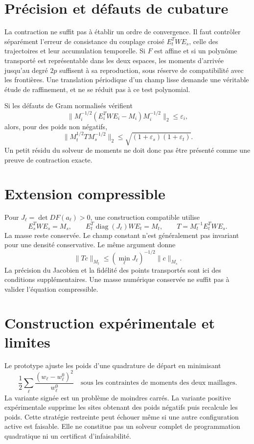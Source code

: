 \documentclass[11pt,a4paper]{article}
\begin{document}
\section{Précision et défauts de cubature}
La contraction ne suffit pas à établir un ordre de convergence. Il faut
contrôler séparément l'erreur de consistance du couplage croisé
$E_t^TWE_s$, celle des trajectoires et leur accumulation temporelle.
Si $F$ est affine et si un polynôme transporté est représentable dans les
deux espaces, les moments d'arrivée jusqu'au degré $2p$ suffisent à sa
reproduction, sous réserve de compatibilité avec les frontières.
Une translation périodique d'un champ lisse demande une véritable étude
de raffinement, et ne se réduit pas à ce test polynomial.

Si les défauts de Gram normalisés vérifient
\[
 \|M_i^{-1/2}(E_i^TWE_i-M_i)M_i^{-1/2}\|_2\leq\varepsilon_i,
\]
alors, pour des poids non négatifs,
\[
 \|M_t^{1/2}TM_s^{-1/2}\|_2
 \leq\sqrt{(1+\varepsilon_s)(1+\varepsilon_t)}.
\]
Un petit résidu du solveur de moments ne doit donc pas être présenté comme
une preuve de contraction exacte.

\section{Extension compressible}
Pour $J_\ell=\det DF(a_\ell)>0$, une construction compatible utilise
\[
 E_s^TWE_s=M_s,\qquad E_t^T\operatorname{diag}(J_\ell)WE_t=M_t,
 \qquad T=M_t^{-1}E_t^TWE_s.
\]
La masse reste conservée. Le champ constant n'est généralement pas invariant
pour une densité conservative. Le même argument donne
\[
 \|Tc\|_{M_t}\leq (\min_\ell J_\ell)^{-1/2}\|c\|_{M_s}.
\]
La précision du Jacobien et la fidélité des points transportés sont ici des
conditions supplémentaires. Une masse numérique conservée ne suffit pas à
valider l'équation compressible.

\section{Construction expérimentale et limites}
Le prototype ajuste les poids d'une quadrature de départ en minimisant
\[
 \frac12\sum_\ell\frac{(w_\ell-w_\ell^0)^2}{w_\ell^0}
 \quad\text{sous les contraintes de moments des deux maillages.}
\]
La variante signée est un problème de moindres carrés. La variante positive
expérimentale supprime les sites obtenant des poids négatifs puis recalcule
les poids. Cette stratégie restreinte peut échouer même si une autre
configuration active est faisable. Elle ne constitue pas un solveur complet
de programmation quadratique ni un certificat d'infaisabilité.
\end{document}
